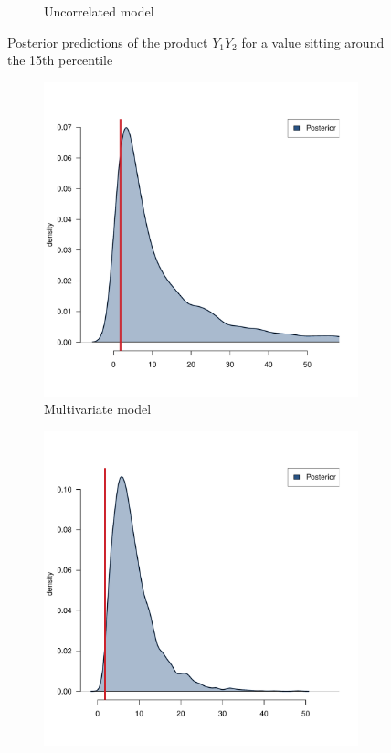 \begin{figure}[htb]
\begin{subfigure}{0.4\textwidth}
		\caption{Uncorrelated model}
		\label{fig:cdiagram}
	\end{subfigure}
	\caption{Posterior predictions of the product \( Y_1 Y_2 \) for a value sitting around the 15\textup{th} percentile}
	\label{fig::res-15}
\end{figure}

\begin{figure}[htb]
	\centering
	\begin{subfigure}{0.4\textwidth}
		\includegraphics{./Figures/50th-percentile_corr.pdf}
		\caption{Multivariate model}
		\label{fig:capparatus}
	\end{subfigure}
	\hfil
	\begin{subfigure}{0.4\textwidth}
		\includegraphics{./Figures/50th-percentile_uncorr.pdf}

\end{subfigure}
\end{figure}
